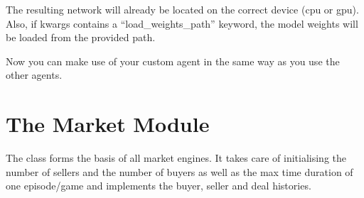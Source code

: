 \documentclass[letterpaper,10pt,english]{sphinxmanual}
\begin{document}
\begin{sphinxVerbatim}[commandchars=\\\{\},numbers=left,firstnumber=1,stepnumber=1]
   

 
          
            
        
         
            

        
\end{sphinxVerbatim}

\sphinxAtStartPar
The resulting network will already be located on the correct device (cpu or gpu). Also, if kwargs contains a
“load\_weights\_path” keyword, the model weights will be loaded from the provided path.

\sphinxAtStartPar
Now you can make use of your custom agent in the same way as you use the other agents.


\section{The Market Module}
\label{\detokenize{MultiAgentMarketRL:the-market-module}}
\sphinxAtStartPar
The  class forms the basis of all market engines. It takes care of initialising the number of
sellers and the number of buyers as well as the max time duration of one episode/game and implements the buyer, seller
and deal histories.
\end{document}
